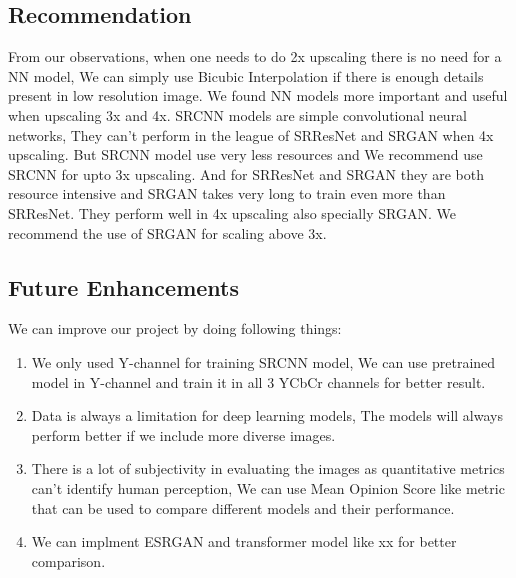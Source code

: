 \clearpage
\newpage
\subsection{Recommendation}
From our observations, when one needs to do 2x upscaling there is no need for a NN model, We can simply use Bicubic Interpolation if there is enough details present in low resolution image. We found NN models more important and useful when upscaling 3x and 4x. SRCNN models are simple convolutional neural networks, They can't perform in the league of SRResNet and SRGAN when 4x upscaling. But SRCNN model use very less resources and We recommend use SRCNN for upto 3x upscaling. And for SRResNet and SRGAN they are both resource intensive and SRGAN takes very long to train even more than SRResNet. They perform well in 4x upscaling also specially SRGAN. We recommend the use of SRGAN for scaling above 3x.
\subsection{Future Enhancements}
We can improve our project by doing following things:
\begin{enumerate}
    \item We only used Y-channel for training SRCNN model, We can use pretrained model in Y-channel and train it in all 3 YCbCr channels for better result.
    \item Data is always a limitation for deep learning models, The models will always perform better if we include more diverse images.
    \item There is a lot of subjectivity in evaluating the images as quantitative metrics can't identify human perception, We can use Mean Opinion Score like metric that can be used to compare different models and their performance.
    \item  We can implment ESRGAN and transformer model like xx for better comparison.
\end{enumerate}
